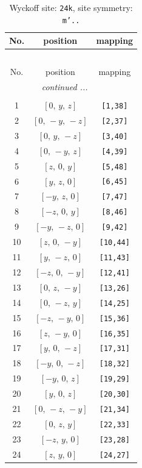\documentclass[fleqn,8pt]{jsarticle}
\begin{document}
\begin{longtable}{ccc}
\caption{Wyckoff site: {\tt 24k}, site symmetry: {\tt m'..}}
 \\
 \hline \hline
No. & position & mapping \\ \hline \endfirsthead

\multicolumn{2}{l}{\tablename\ \thetable{}} \\
 \hline \hline
No. & position & mapping \\ \hline \endhead

 \hline \hline
\multicolumn{2}{r}{\footnotesize\it continued ...} \\ \endfoot

 \hline \hline
\multicolumn{2}{r}{} \\ \endlastfoot

1 & $\left[ 0,\, y,\, z \right]$ & {\tt [1,38]} \\ \hline
2 & $\left[ 0,\, - y,\, - z \right]$ & {\tt [2,37]} \\ \hline
3 & $\left[ 0,\, y,\, - z \right]$ & {\tt [3,40]} \\ \hline
4 & $\left[ 0,\, - y,\, z \right]$ & {\tt [4,39]} \\ \hline
5 & $\left[ z,\, 0,\, y \right]$ & {\tt [5,48]} \\ \hline
6 & $\left[ y,\, z,\, 0 \right]$ & {\tt [6,45]} \\ \hline
7 & $\left[ - y,\, z,\, 0 \right]$ & {\tt [7,47]} \\ \hline
8 & $\left[ - z,\, 0,\, y \right]$ & {\tt [8,46]} \\ \hline
9 & $\left[ - y,\, - z,\, 0 \right]$ & {\tt [9,42]} \\ \hline
10 & $\left[ z,\, 0,\, - y \right]$ & {\tt [10,44]} \\ \hline
11 & $\left[ y,\, - z,\, 0 \right]$ & {\tt [11,43]} \\ \hline
12 & $\left[ - z,\, 0,\, - y \right]$ & {\tt [12,41]} \\ \hline
13 & $\left[ 0,\, z,\, - y \right]$ & {\tt [13,26]} \\ \hline
14 & $\left[ 0,\, - z,\, y \right]$ & {\tt [14,25]} \\ \hline
15 & $\left[ - z,\, - y,\, 0 \right]$ & {\tt [15,36]} \\ \hline
16 & $\left[ z,\, - y,\, 0 \right]$ & {\tt [16,35]} \\ \hline
17 & $\left[ y,\, 0,\, - z \right]$ & {\tt [17,31]} \\ \hline
18 & $\left[ - y,\, 0,\, - z \right]$ & {\tt [18,32]} \\ \hline
19 & $\left[ - y,\, 0,\, z \right]$ & {\tt [19,29]} \\ \hline
20 & $\left[ y,\, 0,\, z \right]$ & {\tt [20,30]} \\ \hline
21 & $\left[ 0,\, - z,\, - y \right]$ & {\tt [21,34]} \\ \hline
22 & $\left[ 0,\, z,\, y \right]$ & {\tt [22,33]} \\ \hline
23 & $\left[ - z,\, y,\, 0 \right]$ & {\tt [23,28]} \\ \hline
24 & $\left[ z,\, y,\, 0 \right]$ & {\tt [24,27]} \\
\end{longtable}
\end{document}
